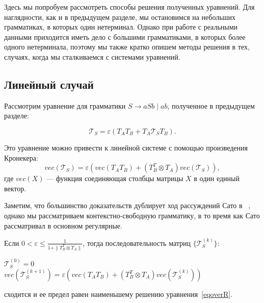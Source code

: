 \documentclass[12pt]{matmex-diploma-custom}
\begin{document}
Здесь мы попробуем рассмотреть способы решения полученных уравнений. 
Для наглядности, как и в предыдущем разделе, мы остановимся на небольших грамматиках, в которых один нетерминал.
Однако при работе с реальными данными приходится иметь дело с большими грамматиками, в которых более одного нетерминала, поэтому мы также кратко опишем методы решения в тех, случаях, когда мы сталкиваемся с системами уравнений. 

\subsection{Линейный случай}

Рассмотрим уравнение для грамматики $S \rightarrow aSb \mid ab$, полученное в предыдущем разделе:

\begin{equation}
    \mathcal{T}_S = \varepsilon (T_AT_B + T_A\mathcal{T}_S T_B).
\label{eqoverR}
\end{equation}

Это уравнение можно привести к линейной системе с помощью произведения Кронекера:
$$vec(\mathcal{T}_S) = \varepsilon (vec(T_AT_B) + (T_B^T \otimes T_A)vec(\mathcal{T}_S)),$$
где $vec(X)$ --- функция соединяющая столбцы матрицы $X$ в один единый вектор. 

Заметим, что большинство доказательств дублирует ход рассуждений Сато в ~\cite{sato2017linear}, однако мы рассматриваем контекстно-свободную грамматику, в то время как Сато рассматривал в основном регулярные.


\begin{lemma}
Если $\displaystyle  0 < \varepsilon \leq \frac{1}{1 + \| T_B^T \otimes T_A\|}$, тогда последовательность матриц $\{ \mathcal{T}_S^{(k)}\}$: 
\begin{center}
$\mathcal{T}_S^{(0)} = 0$ \\
$vec(\mathcal{T}_S^{(k+1)}) = \varepsilon (vec(T_AT_B) + (T_B^T \otimes T_A)vec(\mathcal{T}_S^{(k)}))$ 
\end{center}
сходится и ее предел равен наименьшему решению уравнения~\ref{eqoverR}.

\end{lemma}
\end{document}
